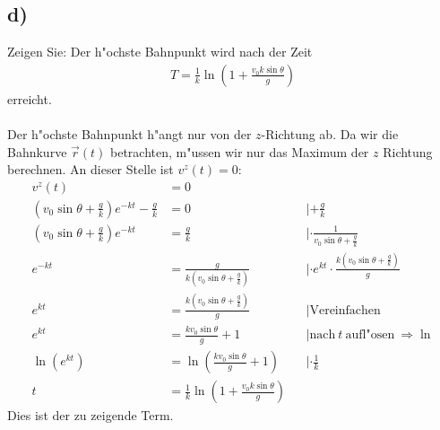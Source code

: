 \documentclass{theozettel}
\begin{document}
\subsection*{d)} Zeigen Sie: Der h"ochste Bahnpunkt wird nach der Zeit
\begin{align*}
T=\frac{1}{k}\ln\left(1+\frac{v_0k\sin\theta}{g}\right)
\end{align*}
erreicht.\\\\
Der h"ochste Bahnpunkt h"angt nur von der $z$-Richtung ab. Da wir die Bahnkurve $\vec{r}\left(t\right)$ betrachten, m"ussen wir nur das Maximum der $z$ Richtung berechnen. An dieser Stelle ist $v^z\left(t\right)=0$:
\begin{align*}
v^z\left(t\right)&=0\\
\left(v_0\sin\theta +\frac{g}{k}\right)e^{-kt}-\frac{g}{k}&=0&&|+\frac{g}{k}\\
\left(v_0\sin\theta +\frac{g}{k}\right)e^{-kt}&=\frac{g}{k}&&|\cdot \frac{1}{v_0\sin\theta +\frac{g}{k}}\\
e^{-kt}&=\frac{g}{k\left(v_0\sin\theta +\frac{g}{k}\right)}&&|\cdot e^{kt}\cdot\frac{k\left(v_0\sin\theta +\frac{g}{k}\right)}{g} \\
e^{kt}&=\frac{k\left(v_0\sin\theta +\frac{g}{k}\right)}{g}&&|\text{Vereinfachen}\\
e^{kt}&=\frac{kv_0\sin\theta}{g}+1&&|\text{nach} \ t \ \text{aufl"osen} \ \Rightarrow \ln\\
\ln\left(e^{kt}\right)&=\ln\left(\frac{kv_0\sin\theta}{g}+1\right)&&|\cdot\frac{1}{k}\\
t&=\frac{1}{k}\ln\left(1+\frac{v_0k\sin\theta}{g}\right)
\end{align*}
Dies ist der zu zeigende Term.
\newpage
\end{document}

